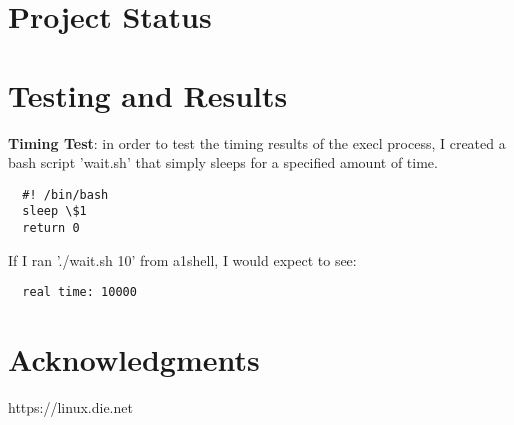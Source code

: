 \documentclass{article}
\begin{document}
\section{Project Status}

\section{Testing and Results}
\textbf{Timing Test}:
in order to test the timing results of the execl process, I created a  bash script
'wait.sh' that simply sleeps for a specified amount of time.
\begin{verbatim}
  #! /bin/bash
  sleep \$1
  return 0
\end{verbatim}
If I ran './wait.sh 10' from a1shell, I would expect to see:
\begin{verbatim}
  real time: 10000
\end{verbatim}


\section{Acknowledgments}
https://linux.die.net
\end{document}
